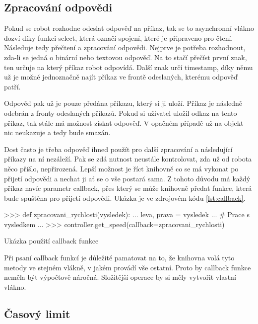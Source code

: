     \subsection{Zpracování odpovědi}

    Pokud se robot rozhodne odeslat odpověď na příkaz, tak se to asynchronní
    vlákno dozví díky funkci select, která označí spojení, které je připraveno
    pro čtení. Následuje tedy přečtení a zpracování odpovědi. Nejprve je
    potřeba rozhodnout, zda-li se jedná o binární nebo textovou odpověď. Na to
    stačí přečíst první znak, ten určuje na který příkaz robot odpovídá. Další
    znak určí timestamp, díky němu už je možné jednoznačně najít příkaz ve
    frontě odeslaných, kterému odpověď patří.

    Odpověď pak už je pouze předána příkazu, který si ji uloží. Příkaz je
    následně odebrán z fronty odeslaných příkazů. Pokud si uživatel uložil
    odkaz na tento příkaz, tak stále má možnost získat odpověď. V opačném
    případě už na objekt nic neukazuje a tedy bude smazán.

    Dost často je třeba odpověď ihned použít pro další zpracování a následující
    příkazy na ní nezáleží. Pak se zdá nutnost neustále kontrolovat, zda už od
    robota něco přišlo, nepřirozená. Lepší možnost je říct knihovně co se má
    vykonat po přijetí odpovědi a nechat ji ať se o vše postará sama. Z tohoto
    důvodu má každý příkaz navíc parametr callback, přes který se může knihovně
    předat funkce, která bude spuštěna pro přijetí odpovědi. Ukázka je ve
    zdrojovém kódu \ref{lst:callback}.

    \begin{listing}
    \begin{pyc}
>>> def zpracovani_rychlosti(vysledek):
...    leva, prava = vysledek
...    # Prace s vysledkem
...
>>> controller.get_speed(callback=zpracovani_rychlosti)
    \end{pyc}
    \caption{Ukázka použití callback funkce}
    \label{lst:callback}
    \end{listing}

    Při psaní callback funkcí je důležité pamatovat na to, že knihovna volá
    tyto metody ve stejném vlákně, v jakém provádí vše ostatní. Proto by
    callback funkce neměla být výpočtově náročná. Složitější operace by si měly
    vytvořit vlastní vlákno.

    \subsection{Časový limit}

